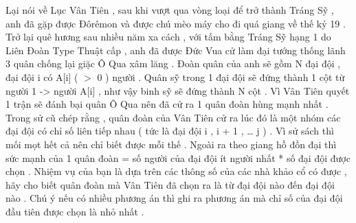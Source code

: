Lại nói về Lục Vân Tiên , sau khi vượt qua vòng loại để trở thành Tráng Sỹ , anh đã gặp được Đôrêmon và được chú mèo máy cho đi quá giang về thế kỷ 19 . Trở lại quê hương sau nhiều năm xa cách , với tấm bằng Tráng Sỹ hạng 1 do Liên Đoàn Type Thuật cấp , anh đã được Đức Vua cử làm đại tướng thống lãnh 3 quân chống lại giặc Ô Qua xâm lăng . Đoàn quân của anh sẽ gồm N đại đội , đại đội i có A[i] ( $>$ 0 ) người . Quân sỹ trong 1 đại đội sẽ đứng thành 1 cột từ người 1 -> người A[i] , như vậy binh sỹ sẽ đứng thành N cột . Vì Vân Tiên quyết 1 trận sẽ đánh bại quân Ô Qua nên đã cử ra 1 quân đoàn hùng mạnh nhất . Trong sử cũ chép rằng , quân đoàn của Vân Tiên cử ra lúc đó là một nhóm các đại đội có chỉ số liên tiếp nhau ( tức là đại đội i , i + 1 , … j ) . Vì sử sách thì mối mọt hết cả nên chỉ biết được mỗi thế . Ngoài ra theo giang hồ đồn đại thì sức mạnh của 1 quân đoàn = số người của đại đội ít người nhất * số đại đội được chọn . Nhiệm vụ của bạn là dựa trên các thông số của các nhà khảo cổ có được , hãy cho biết quân đoàn mà Vân Tiên đã chọn ra là từ đại đội nào đến đại đội nào . Chú ý nếu có nhiều phương án thì ghi ra phương án mà chỉ số của đại đội đầu tiên được chọn là nhỏ nhất .